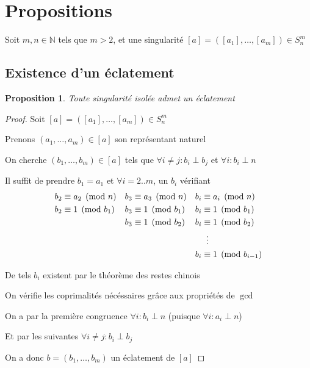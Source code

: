 \documentclass{article}
\newtheorem{proposition}{Proposition}
\begin{document}
\newpage

\section{Propositions}

Soit $m, n \in \mathbb{N}$ tels que $m > 2$, et une singularité $[a] = ([a_1], \dots, [a_m]) \in S_n^m$

\subsection{Existence d'un éclatement}

\begin{proposition}
    Toute singularité isolée admet un éclatement
\end{proposition}

\begin{proof}
    Soit $[a] = ([a_1], \dots, [a_m]) \in S_n^m$

    Prenons $(a_1, \dots, a_m) \in [a]$ son représentant naturel

    On cherche $(b_1, \dots, b_m) \in [a]$ tels que $\forall i \neq j : b_i \perp b_j$ et $\forall i : b_i \perp n$

    Il suffit de prendre $b_1 = a_1$ et $\forall i = 2..m$, un $b_i$ vérifiant
    \begin{align*}
        b_2 & \equiv a_2 \pmod n   & b_3 & \equiv a_3 \pmod n   & b_i & \equiv a_i \pmod n \\
        b_2 & \equiv 1 \pmod {b_1} & b_3 & \equiv 1 \pmod {b_1} & b_i & \equiv 1 \pmod {b_1} \\
            &                      & b_3 & \equiv 1 \pmod {b_2} & b_i & \equiv 1 \pmod {b_2} \\
            &                      &     &                      &     & \vdotswithin{\equiv} \\
            &                      &     &                      & b_i & \equiv 1 \pmod {b_{i-1}}
    \end{align*}

    De tels $b_i$ existent par le théorème des restes chinois

    On vérifie les coprimalités nécéssaires grâce aux propriétés de $\gcd$

    On a par la première congruence $\forall i : b_i \perp n$ (puisque $\forall i : a_i \perp n$)

    Et par les suivantes $\forall i \neq j : b_i \perp b_j$

    On a donc $b = (b_1, \dots, b_m)$ un éclatement de $[a]$
\end{proof}
\end{document}
